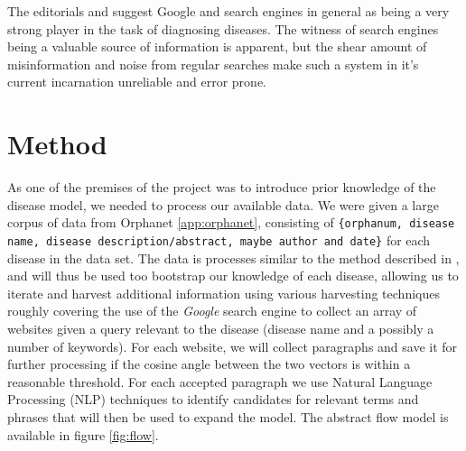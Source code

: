\documentclass[10pt,letterpaper,final]{article}
\begin{document}
The editorials \cite{googlechangemedicine} and
\cite{diagnosissearchengines} suggest Google and search engines in
general as being a very strong player in the task of diagnosing
diseases. The witness of search engines being a valuable source of
information is apparent, but the shear amount of misinformation and
noise from regular searches make such a system in it’s current
incarnation unreliable and error prone.










\section{Method}
As one of the premises of the project was to introduce prior knowledge
of the disease model, we needed to process our available data. We were
given a large corpus of data from Orphanet \ref{app:orphanet},
consisting of \texttt{\{orphanum, disease name, disease
description/abstract, maybe author and date\}} for each disease in the
data set.
The data is processes similar to the method described in
\cite{jensenandersen}, and will thus be used too bootstrap our knowledge
of each disease, allowing us to iterate and harvest additional
information using various harvesting techniques roughly covering the use
of the \textit{Google} search engine to collect an array of websites
given a query relevant to the disease (disease name and a possibly a
number of keywords). For each website, we will collect paragraphs and
save it for further processing if the cosine angle between the two
vectors is within a reasonable threshold. For each accepted paragraph we
use Natural Language Processing (NLP) techniques to identify candidates
for relevant terms and phrases that will then be used to expand the
model. The abstract flow model is available in figure \ref{fig:flow}.
\end{document}
